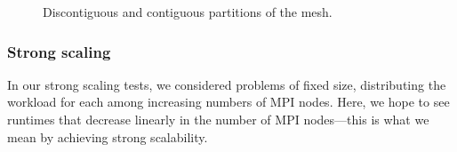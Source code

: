 \begin{figure}[h!]
\centering
{}
\caption{Discontiguous and contiguous partitions of the mesh.}
\end{figure}

\subsubsection{Strong scaling}\label{sec:strongScaling}
In our strong scaling tests, we considered problems of fixed size, distributing the workload for each among increasing numbers of MPI nodes.  Here, we hope to see runtimes that decrease linearly in the number of MPI nodes---this is what we mean by achieving strong scalability.

